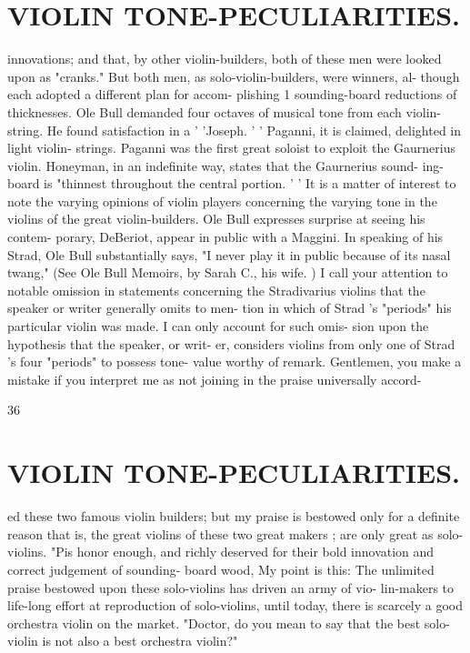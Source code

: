 \documentclass{article}
\begin{document}
\section*{VIOLIN TONE-PECULIARITIES.}
innovations; and that, by other violin-builders, both of these men were looked upon as "cranks." But both men, as solo-violin-builders, were winners, al- though each adopted a different plan for accom- plishing 1 sounding-board reductions of thicknesses. Ole Bull demanded four octaves of musical tone from each violin-string. He found satisfaction in a ' 'Joseph. ' ' Paganni, it is claimed, delighted in light violin- strings. Paganni was the first great soloist to exploit the Gaurnerius violin. Honeyman, in an indefinite way, states that the Gaurnerius sound- ing-board is "thinnest throughout the central portion. ' ' It is a matter of interest to note the varying opinions of violin players concerning the varying tone in the violins of the great violin-builders. Ole Bull expresses surprise at seeing his contem- porary, DeBeriot, appear in public with a Maggini. In speaking of his Strad, Ole Bull substantially says, "I never play it in public because of its nasal twang," (See Ole Bull Memoirs, by Sarah C., his wife. ) I call your attention to notable omission in statements concerning the Stradivarius violins that the speaker or writer generally omits to men- tion in which of Strad 's "periods" his particular violin was made. I can only account for such omis- sion upon the hypothesis that the speaker, or writ- er, considers violins from only one of Strad 's four "periods" to possess tone- value worthy of remark. Gentlemen, you make a mistake if you interpret me as not joining in the praise universally accord-

36

\section*{VIOLIN TONE-PECULIARITIES.}
ed these two famous violin builders; but my praise is bestowed only for a definite reason that is, the great violins of these two great makers ; are only great as solo-violins. "Pis honor enough, and richly deserved for their bold innovation and correct judgement of sounding- board wood, My point is this: The unlimited praise bestowed upon these solo-violins has driven an army of vio- lin-makers to life-long effort at reproduction of solo-violins, until today, there is scarcely a good orchestra violin on the market. "Doctor, do you mean to say that the best solo- violin is not also a best orchestra violin?"
\end{document}
